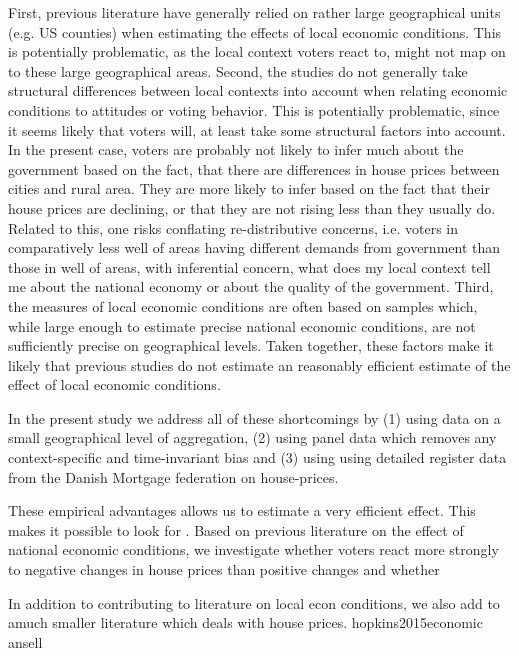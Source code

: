 \documentclass[12pt,a4paper]{article}
\begin{document}
First, previous literature have  generally relied on rather large geographical units (e.g. US counties) when estimating the effects of local economic conditions. This is potentially problematic, as the local context voters react to, might not map on to these large geographical areas. Second, the studies do not generally take structural differences between local contexts into account when relating economic conditions to  attitudes or voting behavior. This is potentially problematic, since it seems likely that voters will, at least take some structural factors into account. In the present case, voters are probably not likely to infer much about the government based on the fact, that there are differences in house prices between cities and rural area. They are more likely to infer based on the fact that their house prices are declining, or that they are not rising less than they usually do. Related to this, one risks conflating re-distributive concerns, i.e. voters in comparatively less well of areas having different demands from government than those in well of areas, with inferential concern, what does my local context tell me about the national economy or about the quality of the government.  Third, the measures of local economic conditions are often based on samples which, while large enough to estimate precise national economic conditions, are not sufficiently precise on geographical levels. Taken together, these factors make it likely that previous studies do not estimate an reasonably efficient estimate of the effect of local economic conditions. 

In the present study we address all of these shortcomings by (1) using data on a small geographical level of aggregation, (2) using panel data which removes any context-specific and time-invariant bias and (3) using  using detailed register data from the Danish Mortgage federation on house-prices.

These empirical advantages allows us to estimate a very efficient effect. This makes it possible to look for . Based on previous literature on the effect of national economic conditions, we investigate whether voters react more strongly to negative changes in house prices than positive changes and whether


In addition to contributing to literature on local econ conditions, we also add to amuch smaller literature which deals with house prices. hopkins2015economic ansell 
\end{document}
